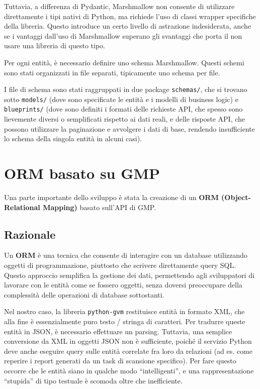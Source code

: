 Tuttavia, a differenza di Pydantic, Marshmallow non consente di utilizzare direttamente i tipi nativi di Python, ma richiede l'uso di classi wrapper specifiche della libreria. Questo introduce un certo livello di astrazione indesiderata, anche se i vantaggi dall'uso di Marshmallow superano gli svantaggi che porta il non usare una libreria di questo tipo.

Per ogni entità, è necessario definire uno schema Marshmallow. Questi schemi sono stati organizzati in file separati, tipicamente uno schema per file.

I file di schema sono stati raggruppati in due package \texttt{schemas/}, che si trovano sotto \texttt{models/} (dove sono specificate le entità e i modelli di business logic) e \texttt{blueprints/} (dove sono definiti i formati delle richieste API, che spesso sono lievemente diversi o semplificati rispetto ai dati reali, e delle risposte API, che possono utilizzare la paginazione e avvolgere i dati di base, rendendo insufficiente lo schema della singola entità in alcuni casi).

\section{ORM basato su GMP}
Una parte importante dello sviluppo è stata la creazione di un \textbf{ORM (Object-Relational Mapping)} basato sull'API di GMP.

\subsection{Razionale}
Un \textbf{ORM} è una tecnica che consente di interagire con un database utilizzando oggetti di programmazione, piuttosto che scrivere direttamente query SQL. Questo approccio semplifica la gestione dei dati, permettendo agli sviluppatori di lavorare con le entità come se fossero oggetti, senza doversi preoccupare della complessità delle operazioni di database sottostanti.

Nel nostro caso, la libreria \texttt{python-gvm} restituisce entità in formato XML, che alla fine è essenzialmente puro testo / stringa di caratteri. Per tradurre queste entità in JSON, è necessario effettuare un parsing. Tuttavia, una semplice conversione da XML in oggetti JSON non è sufficiente, poiché il servizio Python deve anche eseguire query sulle entità correlate fra loro da relazioni (ad es. come reperire i report generati da un task di scansione specifico). Per fare questo occorre che le entità siano in qualche modo ``intelligenti'', e una rappresentazione ``stupida'' di tipo testuale è scomoda oltre che inefficiente.

